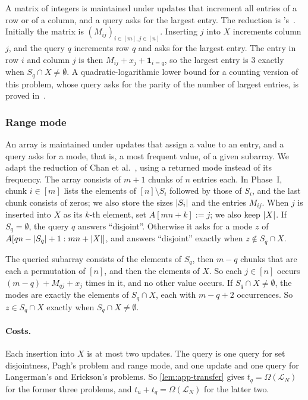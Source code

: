 A matrix of integers is maintained under updates that increment all entries of a row or of a column, and a query asks for the largest entry. The reduction is \Patrascu's~\cite[Section~1.2, proof of Theorem~2]{patrascu_mihai_towards_2010}. Initially the matrix is $(M_{ij})_{i\in[m],j\in[n]}$. Inserting $j$ into $X$ increments column $j$, and the query $q$ increments row $q$ and asks for the largest entry. The entry in row $i$ and column $j$ is then $M_{ij}+x_j+\mathbf 1_{i=q}$, so the largest entry is $3$ exactly when $S_q\cap X\ne\emptyset$. A quadratic-logarithmic lower bound for a counting version of this problem, whose query asks for the parity of the number of largest entries, is proved in~\cite[Corollary~1.2]{ko_omega_2026}.

\subsubsection{Range mode}\label{sec:range-mode}

An array is maintained under updates that assign a value to an entry, and a query asks for a mode, that is, a most frequent value, of a given subarray. We adapt the reduction of Chan et al.~\cite[Section~9.2]{chan_linear-space_2014}, using a returned mode instead of its frequency. The array consists of $m+1$ chunks of $n$ entries each. In Phase~I, chunk $i\in[m]$ lists the elements of $[n]\setminus S_i$ followed by those of $S_i$, and the last chunk consists of zeros; we also store the sizes $\left|S_i\right|$ and the entries $M_{ij}$. When $j$ is inserted into $X$ as its $k$-th element, set $A[mn+k]:=j$; we also keep $\left|X\right|$. If $S_q=\emptyset$, the query $q$ answers ``disjoint''. Otherwise it asks for a mode $z$ of $A[qn-\left|S_q\right|+1:mn+\left|X\right|]$, and answers ``disjoint'' exactly when $z\notin S_q\cap X$.

The queried subarray consists of the elements of $S_q$, then $m-q$ chunks that are each a permutation of $[n]$, and then the elements of $X$. So each $j\in[n]$ occurs $(m-q)+M_{qj}+x_j$ times in it, and no other value occurs. If $S_q\cap X\ne\emptyset$, the modes are exactly the elements of $S_q\cap X$, each with $m-q+2$ occurrences. So $z\in S_q\cap X$ exactly when $S_q\cap X\ne\emptyset$.

\paragraph{Costs.}
Each insertion into $X$ is at most two updates. The query is one query for set disjointness, Pagh's problem and range mode, and one update and one query for Langerman's and Erickson's problems. So \cref{lem:app-transfer} gives $t_q=\Omega(\mathcal L_N)$ for the former three problems, and $t_u+t_q=\Omega(\mathcal L_N)$ for the latter two.

